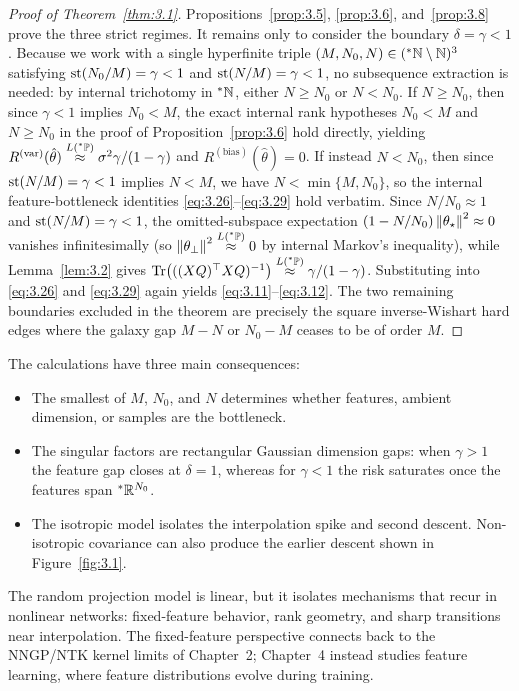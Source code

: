 \begin{proof}[Proof of Theorem~\ref{thm:3.1}]
Propositions~\ref{prop:3.5}, \ref{prop:3.6}, and~\ref{prop:3.8} prove the three strict regimes. It remains only to consider the boundary $\delta = \gamma < 1$. Because we work with a single hyperfinite triple $(M, N_0, N) \in ({}^*\mathbb{N} \setminus \mathbb{N})^3$ satisfying $\operatorname{st}(N_0 / M) = \gamma < 1$ and $\operatorname{st}(N / M) = \gamma < 1$, no subsequence extraction is needed: by internal trichotomy in ${}^*\mathbb{N}$, either $N \ge N_0$ or $N < N_0$. If $N \ge N_0$, then since $\gamma < 1$ implies $N_0 < M$, the exact internal rank hypotheses $N_0 < M$ and $N \ge N_0$ in the proof of Proposition~\ref{prop:3.6} hold directly, yielding $R^{(\mathrm{var})}(\hat{\theta}) \stackrel{L({}^*\mathbb{P})}{\approx} \sigma^2 \gamma / (1 - \gamma)$ and $R^{(\mathrm{bias})}(\hat{\theta}) = 0$. If instead $N < N_0$, then since $\operatorname{st}(N / M) = \gamma < 1$ implies $N < M$, we have $N < \min\{M, N_0\}$, so the internal feature-bottleneck identities \eqref{eq:3.26}--\eqref{eq:3.29} hold verbatim. Since $N / N_0 \approx 1$ and $\operatorname{st}(N / M) = \gamma < 1$, the omitted-subspace expectation $(1 - N / N_0)\left\lVert \theta_\star \right\rVert^2 \approx 0$ vanishes infinitesimally (so $\left\lVert \theta_\perp \right\rVert^2 \stackrel{L({}^*\mathbb{P})}{\approx} 0$ by internal Markov's inequality), while Lemma~\ref{lem:3.2} gives $\operatorname{Tr}\bigl(((XQ)^\top XQ)^{-1}\bigr) \stackrel{L({}^*\mathbb{P})}{\approx} \gamma / (1 - \gamma)$. Substituting into \eqref{eq:3.26} and \eqref{eq:3.29} again yields \eqref{eq:3.11}--\eqref{eq:3.12}. The two remaining boundaries excluded in the theorem are precisely the square inverse-Wishart hard edges where the galaxy gap $M - N$ or $N_0 - M$ ceases to be of order $M$.
\end{proof}

The calculations have three main consequences:
\begin{itemize}
\item The smallest of $M$, $N_0$, and $N$ determines whether features, ambient dimension, or samples are the bottleneck.
\item The singular factors are rectangular Gaussian dimension gaps: when $\gamma > 1$ the feature gap closes at $\delta = 1$, whereas for $\gamma < 1$ the risk saturates once the features span ${}^*\mathbb{R}^{N_0}$.
\item The isotropic model isolates the interpolation spike and second descent. Non-isotropic covariance can also produce the earlier descent shown in Figure~\ref{fig:3.1}.
\end{itemize}

The random projection model is linear, but it isolates mechanisms that recur in nonlinear networks: fixed-feature behavior, rank geometry, and sharp transitions near interpolation. The fixed-feature perspective connects back to the NNGP/NTK kernel limits of Chapter~2; Chapter~4 instead studies feature learning, where feature distributions evolve during training.


